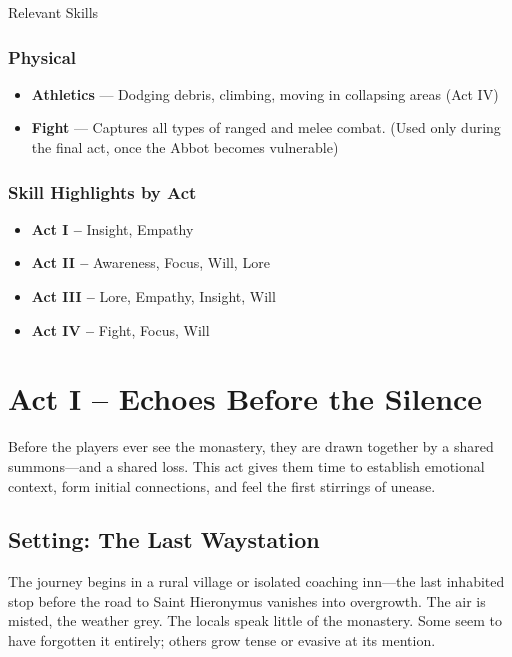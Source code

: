 \documentclass[nodeprecatedcode,bg=print]{dndbook/dndbook}
\begin{document}
\begin{WyrdSidebar}{Relevant Skills}
    \subsubsection{Physical}
    \begin{itemize}
        \item \textbf{Athletics} — Dodging debris, climbing, moving in collapsing areas (Act IV)
        \item \textbf{Fight} — Captures all types of ranged and melee combat. (Used only during the final act, once the Abbot becomes vulnerable)
    \end{itemize}
    
    \subsubsection{Skill Highlights by Act}
    \begin{itemize}
        \item \textbf{Act I –} Insight, Empathy
        \item \textbf{Act II –} Awareness, Focus, Will, Lore
        \item \textbf{Act III –} Lore, Empathy, Insight, Will
        \item \textbf{Act IV –} Fight, Focus, Will
    \end{itemize}
    
\end{WyrdSidebar}
    

\section*{Act I – Echoes Before the Silence}

Before the players ever see the monastery, they are drawn together by a shared summons—and a shared loss. This act gives them time to establish emotional context, form initial connections, and feel the first stirrings of unease.

\vspace{0.5\baselineskip}

\subsection*{Setting: The Last Waystation}

The journey begins in a rural village or isolated coaching inn—the last inhabited stop before the road to Saint Hieronymus vanishes into overgrowth. The air is misted, the weather grey. The locals speak little of the monastery. Some seem to have forgotten it entirely; others grow tense or evasive at its mention.
\end{document}
